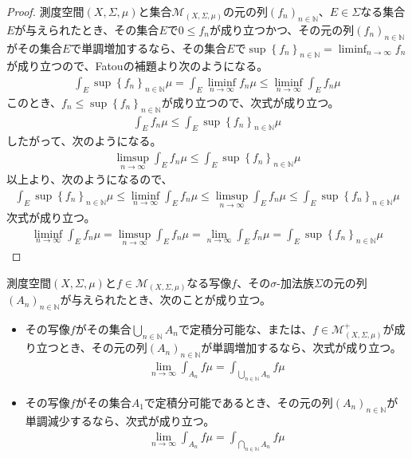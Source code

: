 \documentclass[dvipdfmx]{jsarticle}
\begin{document}
\begin{proof}
測度空間$(X,\varSigma,\mu)$と集合$\mathcal{M}_{(X,\varSigma,\mu)}$の元の列$\left( f_{n} \right)_{n \in \mathbb{N}}$、$E \in \varSigma$なる集合$E$が与えられたとき、その集合$E$で$0 \leq f_{n}$が成り立つかつ、その元の列$\left( f_{n} \right)_{n \in \mathbb{N}}$がその集合$E$で単調増加するなら、その集合$E$で$\sup\left\{ f_{n} \right\}_{n \in \mathbb{N}} = \liminf_{n \rightarrow \infty}f_{n}$が成り立つので、Fatouの補題より次のようになる。
\begin{align*}
\int_{E} {\sup\left\{ f_{n} \right\}_{n \in \mathbb{N}}\mu} = \int_{E} {\liminf_{n \rightarrow \infty}f_{n}\mu} \leq \liminf_{n \rightarrow \infty}{\int_{E} {f_{n}\mu}}
\end{align*}
このとき、$f_{n} \leq \sup\left\{ f_{n} \right\}_{n \in \mathbb{N}}$が成り立つので、次式が成り立つ。
\begin{align*}
\int_{E} {f_{n}\mu} \leq \int_{E} {\sup\left\{ f_{n} \right\}_{n \in \mathbb{N}}\mu}
\end{align*}
したがって、次のようになる。
\begin{align*}
\limsup_{n \rightarrow \infty}{\int_{E} {f_{n}\mu}} \leq \int_{E} {\sup\left\{ f_{n} \right\}_{n \in \mathbb{N}}\mu}
\end{align*}
以上より、次のようになるので、
\begin{align*}
\int_{E} {\sup\left\{ f_{n} \right\}_{n \in \mathbb{N}}\mu} \leq \liminf_{n \rightarrow \infty}{\int_{E} {f_{n}\mu}} \leq \limsup_{n \rightarrow \infty}{\int_{E} {f_{n}\mu}} \leq \int_{E} {\sup\left\{ f_{n} \right\}_{n \in \mathbb{N}}\mu}
\end{align*}
次式が成り立つ。
\begin{align*}
\liminf_{n \rightarrow \infty}{\int_{E} {f_{n}\mu}} = \limsup_{n \rightarrow \infty}{\int_{E} {f_{n}\mu}} = \lim_{n \rightarrow \infty}{\int_{E} {f_{n}\mu}} = \int_{E} {\sup\left\{ f_{n} \right\}_{n \in \mathbb{N}}\mu}
\end{align*}
\end{proof}
\begin{thm}\label{4.6.1.27}
測度空間$(X,\varSigma,\mu)$と$f \in \mathcal{M}_{(X,\varSigma,\mu)}$なる写像$f$、その$\sigma$-加法族$\varSigma$の元の列$\left( A_{n} \right)_{n \in \mathbb{N}}$が与えられたとき、次のことが成り立つ。
\begin{itemize}
\item
  その写像$f$がその集合$\bigcup_{n \in \mathbb{N}} A_{n}$で定積分可能な、または、$f \in \mathcal{M}_{(X,\varSigma,\mu)}^{+}$が成り立つとき、その元の列$\left( A_{n} \right)_{n \in \mathbb{N}}$が単調増加するなら、次式が成り立つ。
\begin{align*}
\lim_{n \rightarrow \infty}{\int_{A_{n}} {f\mu}} = \int_{\bigcup_{n \in \mathbb{N}} A_{n}} {f\mu}
\end{align*}
\item
  その写像$f$がその集合$A_{1}$で定積分可能であるとき、その元の列$\left( A_{n} \right)_{n \in \mathbb{N}}$が単調減少するなら、次式が成り立つ。
\begin{align*}
\lim_{n \rightarrow \infty}{\int_{A_{n}} {f\mu}} = \int_{\bigcap_{n \in \mathbb{N}} A_{n}} {f\mu}
\end{align*}
\end{itemize}
\end{thm}
\end{document}
